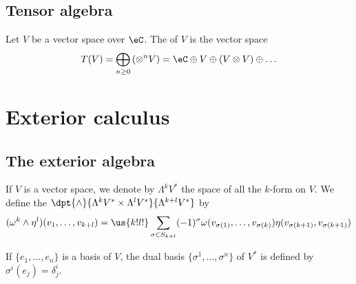 \subsection{Tensor algebra}

\begin{definition}      \label{DEFooHPQXooETvEyn}
	Let \( V\) be a vector space over \( \eC\). The  of \( V\) is the vector space
	\begin{equation}
		T(V)=\bigoplus_{n\geq 0}\left(\otimes^nV\right)=\eC\oplus V\oplus(V\otimes V)\oplus\ldots
	\end{equation}
\end{definition}


\section{Exterior calculus}

\subsection{The exterior algebra}

\begin{definition}
	If $V$ is a vector space, we denote by $\Lambda^kV^*$ the space of all the $k$-form on $V$. We define the  $\dpt{\wedge}{\Lambda^kV^*\times\Lambda^lV^*}{\Lambda^{k+l}V^*}$ by
	\begin{equation}
		(\omega^k\wedge\eta^l)(v_1,\ldots,v_{k+l})
		=\us{k!l!}\sum_{\sigma\in S_{k+l}} (-1)^{\sigma}   \omega(v_{\sigma(1)},\ldots,v_{\sigma(k)})\eta(v_{\sigma(k+1)},v_{\sigma(k+1)})
	\end{equation}
\end{definition}
If $\{e_1,\ldots,e_n\}$ is a basis of $V$, the dual basis $\{\sigma^1,\ldots,\sigma^n\}$ of $V^*$ is defined by $\sigma^i(e_j)=\delta^i_j$.


